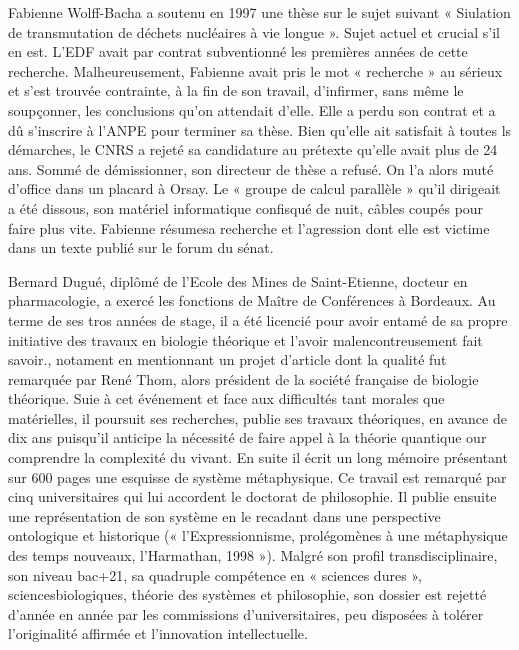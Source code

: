 \documentclass[a4paper,12pt]{article}
\begin{document}
Fabienne Wolff-Bacha a soutenu en 1997 une thèse sur le sujet suivant « Siulation de transmutation de déchets nucléaires à vie longue ». Sujet actuel et crucial s’il en est. L’EDF avait par contrat subventionné les premières années de cette recherche. Malheureusement, Fabienne avait pris le mot « recherche » au sérieux et s’est trouvée contrainte, à la fin de son travail, d’infirmer, sans même le soupçonner, les conclusions qu’on attendait d’elle. Elle a perdu son contrat et a dû s’inscrire à l’ANPE pour terminer sa thèse. Bien qu’elle ait satisfait à toutes ls démarches, le CNRS a rejeté sa candidature au prétexte qu’elle avait plus de 24 ans. Sommé de démissionner, son directeur de thèse a refusé. On l’a alors muté d’office dans un placard à Orsay. Le « groupe de calcul parallèle »  qu’il dirigeait a été dissous, son matériel informatique confisqué de nuit, câbles coupés pour faire plus vite. Fabienne résumesa recherche et l’agression dont elle est victime dans un texte publié sur le forum du sénat.

Bernard Dugué, diplômé de l’Ecole des Mines de Saint-Etienne, docteur en pharmacologie, a exercé les fonctions de Maître de Conférences à Bordeaux. Au terme de ses tros années de stage, il a été licencié pour avoir entamé de sa propre initiative des travaux en biologie théorique et l’avoir malencontreusement fait savoir., notament en mentionnant un projet d’article dont la qualité fut remarquée par René Thom, alors président de la société française de biologie théorique. Suie à cet événement et face aux difficultés tant morales que matérielles, il poursuit ses recherches, publie ses travaux théoriques, en avance de dix ans puisqu’il anticipe la nécessité de faire appel à la théorie quantique our comprendre la complexité du vivant. En suite il écrit un long mémoire présentant sur 600 pages une esquisse de système métaphysique. Ce travail est remarqué par cinq universitaires qui lui accordent le doctorat de philosophie. Il publie ensuite une représentation de son système en le recadant dans une perspective ontologique et historique (« l’Expressionnisme, prolégomènes à une métaphysique des temps nouveaux, l’Harmathan, 1998 »). Malgré son profil transdisciplinaire, son niveau bac+21, sa quadruple compétence en « sciences dures », sciencesbiologiques, théorie des systèmes et philosophie, son dossier est rejetté d’année en année par les commissions d’universitaires, peu disposées à tolérer l’originalité affirmée et l’innovation intellectuelle.
\end{document}

